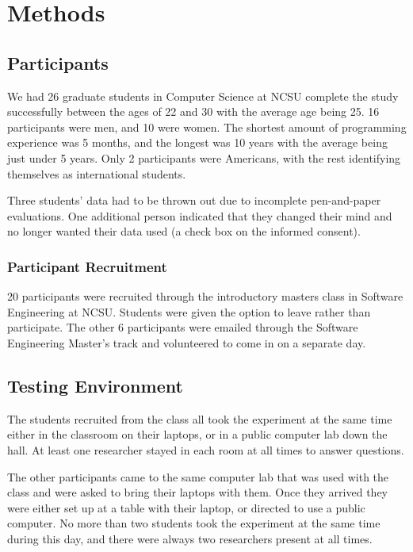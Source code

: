 \documentclass{sig-alternate-05-2015}
\begin{document}
\section{Methods}

\subsection{Participants}
 We had 26 graduate students in Computer Science at NCSU complete the study successfully between the ages of 22 and 30  with the average age being 25.  16 participants were men, and 10 were women.  The shortest amount of programming experience was 5 months, and the longest was 10 years with the average being just under 5 years.  Only 2 participants were Americans, with the rest identifying themselves as international students.  
 
 Three students' data had to be thrown out due to incomplete pen-and-paper evaluations.  One additional person indicated that they changed their mind and no longer wanted their data used (a check box on the informed consent).  
 
 
 \subsubsection{Participant Recruitment} 20 participants were recruited through the introductory masters class in Software Engineering at NCSU.   Students were given the option to leave rather than participate.  The other 6 participants were emailed through the Software Engineering Master's track and volunteered to come in on a separate day. 
 
 \subsection{Testing Environment}
 The students recruited from the class all took the experiment at the same time either in the classroom on their laptops, or in a public computer lab down the hall. At least one researcher stayed in each room at all times to answer questions.
 
 The other participants came to the same computer lab that was used with the class and were asked to bring their laptops with them.  Once they arrived they were either set up at a table with their laptop, or directed to use a public computer.  No more than two students took the experiment at the same time during this day, and there were always two researchers present at all times.  
 
\end{document}
